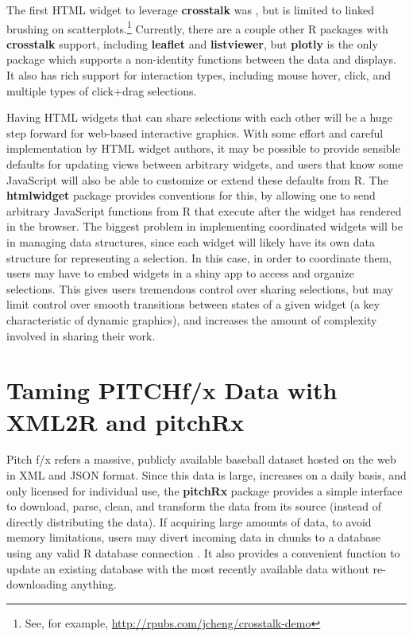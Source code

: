 \documentclass[11pt]{isuthesis}
\begin{document}
The first HTML widget to leverage \textbf{crosstalk} was
\citep{d3scatter}, but is limited to linked brushing on
scatterplots.\footnote{See, for example,
  \url{http://rpubs.com/jcheng/crosstalk-demo}} Currently, there are a
couple other R packages with \textbf{crosstalk} support, including
\textbf{leaflet} and \textbf{listviewer}, but \textbf{plotly} is the
only package which supports a non-identity functions between the data
and displays. It also has rich support for interaction types, including
mouse hover, click, and multiple types of click+drag selections.

Having HTML widgets that can share selections with each other will be a
huge step forward for web-based interactive graphics. With some effort
and careful implementation by HTML widget authors, it may be possible to
provide sensible defaults for updating views between arbitrary widgets,
and users that know some JavaScript will also be able to customize or
extend these defaults from R. The \textbf{htmlwidget} package provides
conventions for this, by allowing one to send arbitrary JavaScript
functions from R that execute after the widget has rendered in the
browser. The biggest problem in implementing coordinated widgets will be
in managing data structures, since each widget will likely have its own
data structure for representing a selection. In this case, in order to
coordinate them, users may have to embed widgets in a shiny app to
access and organize selections. This gives users tremendous control over
sharing selections, but may limit control over smooth transitions
between states of a given widget (a key characteristic of dynamic
graphics), and increases the amount of complexity involved in sharing
their work.

\hypertarget{taming-pitchfx-data-with-xml2r-and-pitchrx}{\chapter{Taming
PITCHf/x Data with XML2R and
pitchRx}\label{taming-pitchfx-data-with-xml2r-and-pitchrx}}

Pitch f/x refers a massive, publicly available baseball dataset hosted
on the web in XML and JSON format. Since this data is large, increases
on a daily basis, and only licensed for individual use, the
\textbf{pitchRx} package provides a simple interface to download, parse,
clean, and transform the data from its source (instead of directly
distributing the data). If acquiring large amounts of data, to avoid
memory limitations, users may divert incoming data in chunks to a
database using any valid R database connection \citep{DBI}. It also
provides a convenient function to update an existing database with the
most recently available data without re-downloading anything.
\end{document}

